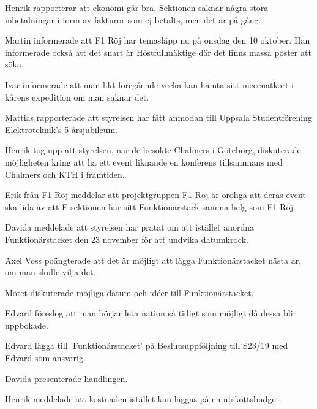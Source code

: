 \documentclass[10pt]{article}
\begin{document}
\begin{paragrafer}
\begin{paragrafer}

Henrik rapporterar att ekonomi går bra. Sektionen saknar några stora inbetalningar i form av fakturor som ej betalts, men det är på gång.  



Martin informerade att F1 Röj har temasläpp nu på onsdag den 10 oktober. Han informerade också att det snart är Höstfullmäktige där det finns massa poster att söka.


Ivar informerade att man likt föregående vecka kan hämta sitt mecenatkort i kårens expedition om man saknar det. 




Mattias rapporterade att styrelsen har fått anmodan till Uppsala Studentförening Elektroteknik's 5-årsjubileum.

Henrik tog upp att styrelsen, när de besökte Chalmers i Göteborg, diskuterade möjligheten kring att ha ett event liknande en konferens tillsammans med Chalmers och KTH i framtiden.

\end{paragrafer}


Erik från F1 Röj meddelar att projektgruppen F1 Röj är oroliga att deras event ska lida av att E-sektionen har sitt Funktionärstack samma helg som F1 Röj. 

Davida meddelade att styrelsen har pratat om att istället anordna Funktionärstacket den 23 november för att undvika datumkrock. 

Axel Voss poängterade att det är möjligt att lägga Funktionärstacket nästa år, om man skulle vilja det. 

Mötet diskuterade möjliga datum och idéer till Funktionärstacket. 

Edvard föreslog att man börjar leta nation så tidigt som möjligt då dessa blir uppbokade. 

Edvard \ypa lägga till 'Funktionärstacket' på Beslutsuppföljning till S23/19 med Edvard som ansvarig. 

\Mbaby



Davida presenterade handlingen.

Henrik meddelade att kostnaden istället kan läggas på en utskottsbudget. 


\end{paragrafer}
\end{document}
